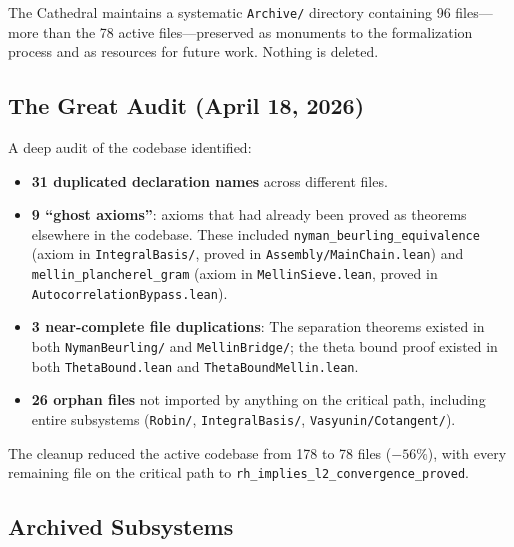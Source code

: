 \documentclass[11pt,a4paper]{article}
\theoremstyle{definition}
\newcommand{\lean}[1]{\texttt{#1}}
\begin{document}
The Cathedral maintains a systematic \lean{Archive/} directory containing
96 files---more than the 78 active files---preserved as monuments to the
formalization process and as resources for future work. Nothing is deleted.

\subsection{The Great Audit (April 18, 2026)}

A deep audit of the codebase identified:
\begin{itemize}
  \item \textbf{31 duplicated declaration names} across different files.
  \item \textbf{9 ``ghost axioms''}: axioms that had already been proved
    as theorems elsewhere in the codebase. These included
    \lean{nyman\_beurling\_equivalence} (axiom in \lean{IntegralBasis/},
    proved in \lean{Assembly/MainChain.lean}) and
    \lean{mellin\_plancherel\_gram} (axiom in \lean{MellinSieve.lean},
    proved in \lean{AutocorrelationBypass.lean}).
  \item \textbf{3 near-complete file duplications}: The separation
    theorems existed in both \lean{NymanBeurling/} and \lean{MellinBridge/};
    the theta bound proof existed in both \lean{ThetaBound.lean} and
    \lean{ThetaBoundMellin.lean}.
  \item \textbf{26 orphan files} not imported by anything on the critical
    path, including entire subsystems (\lean{Robin/}, \lean{IntegralBasis/},
    \lean{Vasyunin/Cotangent/}).
\end{itemize}

The cleanup reduced the active codebase from 178 to 78 files ($-56\%$),
with every remaining file on the critical path to
\lean{rh\_implies\_l2\_convergence\_proved}.

\subsection{Archived Subsystems}
\end{document}
